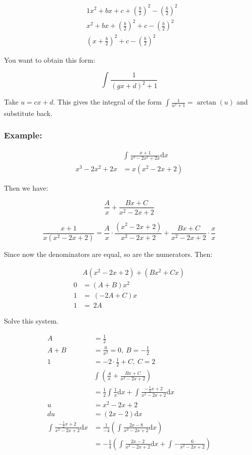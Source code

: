 \documentclass[12pt]{article}
\theoremstyle{plain}
\theoremstyle{remark}
\theoremstyle{definition}
\begin{document}
\begin{align*}
&1x^{2} + bx + c + \left( \frac{b}{2} \right)^{2} - \left( \frac{b}{2} \right)^{2} \\
&x^{2} + bx + \left( \frac{b}{2} \right)^{2} + c - \left( \frac{b}{2} \right)^{2} \\
&\left( x + \frac{b}{2} \right)^{2} + c - \left( \frac{b}{2} \right)^{2}
\end{align*}


You want to obtain this form:

\[\int_{}^{}\frac{1}{(gx + d)^{2} + 1}\]

Take \(u = cx + d\). This gives the integral of the form
\(\int_{}^{}\frac{1}{u^{2} + 1} = \arctan(u)\) and substitute back.


\subsubsection{Example:}

\begin{align*}
&\int_{}^{}{\frac{x + 1}{x^{3} - 2x^{2} + 2x}\text{d}x} \\
x^{3} - 2x^{2} + 2x &= x\left( x^{2} - 2x + 2 \right)
\end{align*}


Then we have:

\[\frac{A}{x} + \frac{Bx + C}{x^{2} - 2x + 2}\]

\[\frac{x + 1}{x\left( x^{2} - 2x + 2 \right)} = \frac{A}{x} \cdot \frac{\left( x^{2} - 2x + 2 \right)}{x^{2} - 2x + 2} + \frac{Bx + C}{x^{2} - 2x + 2} \cdot \frac{x}{x}\]

Since now the denominators are equal, so are the numerators. Then:

\begin{align*}
&A\left( x^{2} - 2x + 2 \right) + \left( Bx^{2} + Cx \right) \\
0 &= (A + B)x^{2} \\
1 &= \ ( - 2A + C)x \\
1 &= \ 2A
\end{align*}


Solve this system.

\begin{align*}
A &= \frac{1}{2} \\
A + B &= \frac{0}{x^{2}} = 0,\ B = - \frac{1}{2} \\
1 &= - 2 \cdot \frac{1}{2} + C,\ C = 2
 \\
&\int_{}^{}\left( \frac{A}{x} + \frac{Bx + C}{x^{2} - 2x + 2} \right) \\
&= \frac{1}{2}\int_{}^{}{\frac{1}{x}\text{d}x} + \int_{}^{}{\frac{- \frac{1}{2}x + 2}{x^{2} - 2x + 2}\text{d}x} \\
u &= x^{2} - 2x + 2 \\
du &= (2x - 2)\text{d}x
 \\
\int_{}^{}{\frac{- \frac{1}{2}x + 2}{x^{2} - 2x + 2}\text{d}x} &= \frac{1}{- 4}\left( \int_{}^{}\frac{2x - 8}{x^{2} - 2x + 2}\text{d}x \right) \\
&= - \frac{1}{4}\left( \int_{}^{}{\frac{2x - 2}{x^{2} - 2x + 2}\text{d}x} + \int_{}^{}{- \frac{6}{x^{2} - 2x + 2}} \right)
\end{align*}
\end{document}
